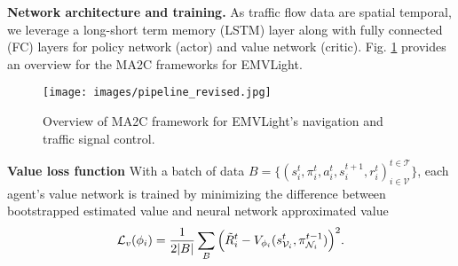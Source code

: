\textbf{Network architecture and training.} 
As traffic flow data are spatial temporal, we leverage a long-short term memory (LSTM) layer along with fully connected (FC) layers for policy network (actor) and value network (critic). Fig. \ref{fig_model} provides an overview for the MA2C frameworks for EMVLight.
\begin{figure}[h]
    \centering
    \texttt{[image: images/pipeline\_revised.jpg]}  
    \caption{Overview of MA2C framework for EMVLight's navigation and traffic signal control.}
    \label{fig_model}
\end{figure}

\textbf{Value loss function}
With a batch of data $B = \{(s_i^t, \pi_i^t, a_i^t, s_i^{t+1}, r_i^t)_{i\in \mathcal{V}}^{t\in \mathcal{T}}\}$, each agent's value network is trained by minimizing the difference between bootstrapped estimated value and neural network approximated value
\begin{equation}
    \label{eqn:L_v}
    \mathcal{L}_v(\phi_i) = \frac{1}{2|B|} \sum_{B}\Big( \Tilde{R}^t_i - V_{\phi_i}(s^t_{\mathcal{V}_i}, \pi^{t-1}_{\mathcal{N}_i}) \Big)^2.
\end{equation}

